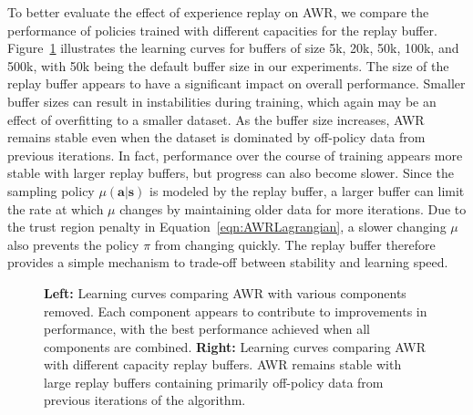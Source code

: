 \documentclass{article} \usepackage{iclr2020_conference,times}
\def\rva{{\mathbf{a}}}
\def\rvs{{\mathbf{s}}}
\begin{document}
To better evaluate the effect of experience replay on AWR, we compare the performance of policies trained with different capacities for the replay buffer. Figure~\ref{fig:learningCurvesAblation} illustrates the learning curves for buffers of size 5k, 20k, 50k, 100k, and 500k, with 50k being the default buffer size in our experiments. The size of the replay buffer appears to have a significant impact on overall performance. Smaller buffer sizes can result in instabilities during training, which again may be an effect of overfitting to a smaller dataset. As the buffer size increases, AWR remains stable even when the dataset is dominated by off-policy data from previous iterations. In fact, performance over the course of training appears more stable with larger replay buffers, but progress can also become slower. Since the sampling policy $\mu(\rva | \rvs)$ is modeled by the replay buffer, a larger buffer can limit the rate at which $\mu$ changes by maintaining older data for more iterations. Due to the trust region penalty
in Equation~\ref{eqn:AWRLagrangian}, a slower changing $\mu$ also prevents the policy $\pi$ from changing quickly. The replay buffer therefore provides a simple mechanism to trade-off between stability and learning speed.

\begin{figure}[t]
	\centering
    \vspace{-0.5cm}
\caption{\textbf{Left:} Learning curves comparing AWR with various components removed. Each component appears to contribute to improvements in performance, with the best performance achieved when all components are combined. \textbf{Right:} Learning curves comparing AWR with different capacity replay buffers. AWR remains stable with large replay buffers containing primarily off-policy data from previous iterations of the algorithm.}
\label{fig:learningCurvesAblation}
\vspace{-0.3cm}
\end{figure}
\end{document}
